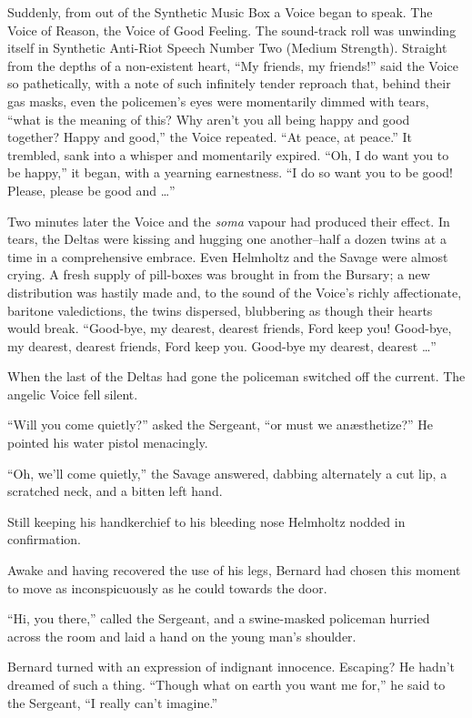 \documentclass[12pt]{report}
\begin{document}
Suddenly, from out of the Synthetic Music Box a Voice began to speak.
The Voice of Reason, the Voice of Good Feeling. The sound-track roll was
unwinding itself in Synthetic Anti-Riot Speech Number Two (Medium
Strength). Straight from the depths of a non-existent heart, ``My
friends, my friends!'' said the Voice so pathetically, with a note of
such infinitely tender reproach that, behind their gas masks, even the
policemen's eyes were momentarily dimmed with tears, ``what is the
meaning of this? Why aren't you all being happy and good together? Happy
and good,'' the Voice repeated. ``At peace, at peace.'' It trembled,
sank into a whisper and momentarily expired. ``Oh, I do want you to be
happy,'' it began, with a yearning earnestness. ``I do so want you to be
good! Please, please be good and \ldots{}''

Two minutes later the Voice and the \emph{soma} vapour had produced
their effect. In tears, the Deltas were kissing and hugging one
another--half a dozen twins at a time in a comprehensive embrace. Even
Helmholtz and the Savage were almost crying. A fresh supply of
pill-boxes was brought in from the Bursary; a new distribution was
hastily made and, to the sound of the Voice's richly affectionate,
baritone valedictions, the twins dispersed, blubbering as though their
hearts would break. ``Good-bye, my dearest, dearest friends, Ford keep
you! Good-bye, my dearest, dearest friends, Ford keep you. Good-bye my
dearest, dearest \ldots{}''

When the last of the Deltas had gone the policeman switched off the
current. The angelic Voice fell silent.

``Will you come quietly?'' asked the Sergeant, ``or must we
anæsthetize?'' He pointed his water pistol menacingly.

``Oh, we'll come quietly,'' the Savage answered, dabbing alternately a
cut lip, a scratched neck, and a bitten left hand.

Still keeping his handkerchief to his bleeding nose Helmholtz nodded in
confirmation.

Awake and having recovered the use of his legs, Bernard had chosen this
moment to move as inconspicuously as he could towards the door.

``Hi, you there,'' called the Sergeant, and a swine-masked policeman
hurried across the room and laid a hand on the young man's shoulder.

Bernard turned with an expression of indignant innocence. Escaping? He
hadn't dreamed of such a thing. ``Though what on earth you want me
for,'' he said to the Sergeant, ``I really can't imagine.''
\end{document}
